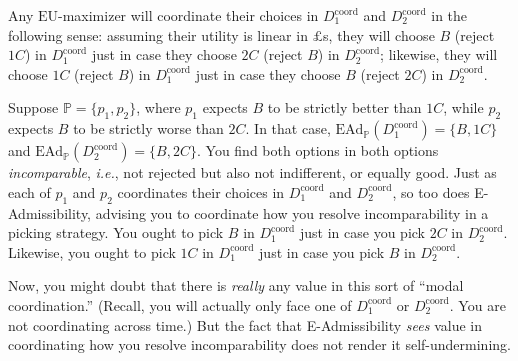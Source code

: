 \documentclass[a4paper]{article}
\renewcommand\P{\mathbb{P}} %
\newcommand\EU{\mathrm{EU}}
\newcommand\EAd{\mathrm{EAd}}
\newcommand\U{\mathfrak{U}} %
\newcommand{\D}{\mathcal{D}}
\newcommand\s{\mathsf{s}}
\newcommand{\IP}{\P}
\newcommand{\todoold}[2][]{\todo[backgroundcolor=white,bordercolor=orange!10,linecolor=gray!10, #1,caption={},textcolor=gray]{Pre-rev: #2}}
\newenvironment{CCM rewritten}
{\begingroup\color{blue}} %
{\endgroup}              %
\begin{document}
	Any $\EU$-maximizer will coordinate their choices in $D^{\mathrm{coord}}_1$ and $D^{\mathrm{coord}}_2$ in the following sense: assuming their utility is linear in $\pounds$s, they will choose $B$ (reject $1C$) in $D^{\mathrm{coord}}_1$ just in case they choose $2C$ (reject $B$) in $D^{\mathrm{coord}}_2$; likewise, they will choose $1C$ (reject $B$) in $D^{\mathrm{coord}}_1$ just in case they choose $B$ (reject $2C$) in $D^{\mathrm{coord}}_2$. 
	
	Suppose $\IP = \{p_1, p_2\}$, where $p_1$ expects $B$ to be strictly better than $1C$, while $p_2$ expects $B$ to be strictly worse than $2C$. In that case, $\EAd_\IP(D^{\mathrm{coord}}_1)=\{B,1C\}$ and $\EAd_\IP(D^{\mathrm{coord}}_2)=\{B,2C\}$. You find both options in both options \emph{incomparable}, \emph{i.e.}, not rejected but also not indifferent, or equally good. Just as each of $p_1$ and $p_2$ coordinates their choices in $D^{\mathrm{coord}}_1$ and $D^{\mathrm{coord}}_2$, so too does E-Admissibility, advising you to coordinate how you resolve incomparability in a picking strategy. You ought to pick $B$ in $D^{\mathrm{coord}}_1$ just in case you pick $2C$ in $D^{\mathrm{coord}}_2$. Likewise, you ought to pick $1C$ in $D^{\mathrm{coord}}_1$ just in case you pick $B$ in $D^{\mathrm{coord}}_2$. 

	
	
	Now, you might doubt that there is \emph{really} any value in this sort of ``modal coordination.'' (Recall, you will actually only face one of $D^{\mathrm{coord}}_1$ or $D^{\mathrm{coord}}_2$. You are not coordinating across time.) But the fact that E-Admissibility \emph{sees} value in coordinating how you resolve incomparability does not render it self-undermining.
	
\end{document}
